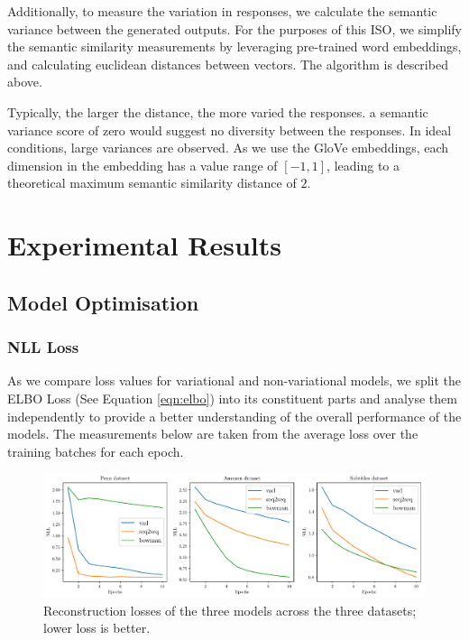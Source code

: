 \documentclass[12pt,twoside]{report}
\begin{document}
Additionally, to measure the variation in responses, we calculate the semantic variance between the generated outputs. For the purposes of this ISO, we simplify the semantic similarity measurements by leveraging pre-trained word embeddings, and calculating euclidean distances between vectors. The algorithm is described above.

Typically, the larger the distance, the more varied the responses. a semantic variance score of zero would suggest no diversity between the responses. In ideal conditions, large variances are observed. As we use the GloVe embeddings, each dimension in the embedding has a value range of $[-1,1]$, leading to a theoretical maximum semantic similarity distance of $2$.

\chapter{Experimental Results}


\section{Model Optimisation}
\subsection{NLL Loss}

As we compare loss values for variational and non-variational models, we split the ELBO Loss (See Equation \ref{eqn:elbo}) into its constituent parts and analyse them independently to provide a better understanding of the overall performance of the models. The measurements below are taken from the average loss over the training batches for each epoch.

\begin{figure}[!ht]
	\centering
	\includegraphics[width=150mm]{results/nll.pdf}
	\caption{Reconstruction losses of the three models across the three datasets; lower loss is better. \label{r:nll}}
  \end{figure}
\end{document}
